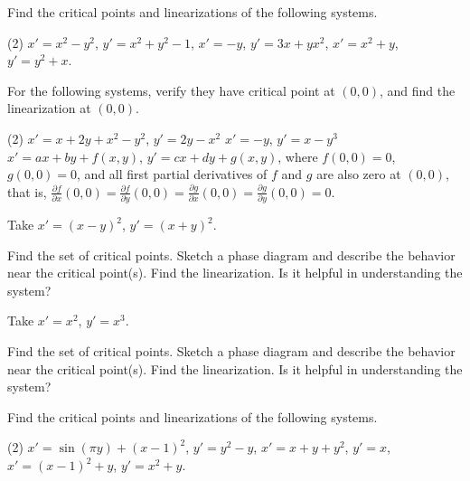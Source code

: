 \begin{exercise}
Find the critical points and linearizations of the following systems.
\begin{tasks}(2)
\task $x'=x^2-y^2$, \enspace $y'=x^2+y^2-1$,
\task $x'=-y$, \enspace $y'=3x+yx^2$,
\task $x'=x^2+y$, \enspace $y'=y^2+x$.
\end{tasks}
\end{exercise}

\begin{exercise}
For the following systems, verify they have critical point at $(0,0)$,
and find the linearization at $(0,0)$.
\begin{tasks}(2)
\task $x'=x+2y+x^2-y^2$, \enspace $y'=2y-x^2$
\task $x'=-y$, \enspace $y'=x-y^3$
\task* $x'=ax+by+f(x,y)$, $y'=cx+dy+g(x,y)$, where
$f(0,0) = 0$,
$g(0,0) = 0$, and all first partial derivatives of $f$ and $g$ are
also zero at $(0,0)$, that is,
$\frac{\partial f}{\partial x}(0,0) = 
\frac{\partial f}{\partial y}(0,0) = 
\frac{\partial g}{\partial x}(0,0) = 
\frac{\partial g}{\partial y}(0,0) = 0$.
\end{tasks}
\end{exercise}

\begin{exercise}
Take $x'=(x-y)^2$, \enspace $y'=(x+y)^2$. 
\begin{tasks}
\task Find the set of critical points.
\task Sketch a phase diagram and describe the behavior near the critical
point(s).
\task Find the linearization.  Is it helpful in understanding the system?
\end{tasks}
\end{exercise}

\begin{exercise}
Take $x'=x^2$, \enspace $y'=x^3$.
\begin{tasks}
\task Find the set of critical points.
\task Sketch a phase diagram and describe the behavior near the critical
point(s).
\task Find the linearization.  Is it helpful in understanding the system?
\end{tasks}
\end{exercise}

\setcounter{exercise}{100}

\pagebreak[2]
\begin{exercise}
Find the critical points and linearizations of the following systems.
\begin{tasks}(2)
\task $x'=\sin(\pi y)+(x-1)^2$, \enspace $y'=y^2-y$,
\task $x'=x+y+y^2$, \enspace $y'=x$,
\task $x'=(x-1)^2+y$, \enspace $y'=x^2+y$.
\end{tasks}
\end{exercise}

